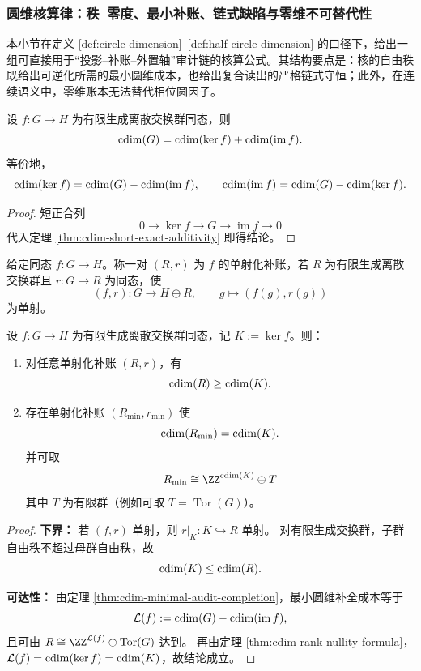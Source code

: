 \subsubsection{圆维核算律：秩--零度、最小补账、链式缺陷与零维不可替代性}\label{subsubsec:cdim-kernel-defect-incompressibility}

本小节在定义 \ref{def:circle-dimension}--\ref{def:half-circle-dimension} 的口径下，给出一组可直接用于“投影--补账--外置轴”审计链的核算公式。其结构要点是：核的自由秩既给出可逆化所需的最小圆维成本，也给出复合读出的严格链式守恒；此外，在连续语义中，零维账本无法替代相位圆因子。

\begin{theorem}\label{thm:cdim-rank-nullity-formula}
设 \(f:G\to H\) 为有限生成离散交换群同态，则
\[
\operatorname{cdim}(G)=\operatorname{cdim}(\ker f)+\operatorname{cdim}(\operatorname{im}f).
\]
等价地，
\[
\operatorname{cdim}(\ker f)=\operatorname{cdim}(G)-\operatorname{cdim}(\operatorname{im}f),\qquad
\operatorname{cdim}(\operatorname{im}f)=\operatorname{cdim}(G)-\operatorname{cdim}(\ker f).
\]
\end{theorem}
\begin{proof}
短正合列
\[
0\longrightarrow \ker f\longrightarrow G\longrightarrow \operatorname{im}f\longrightarrow 0
\]
代入定理 \ref{thm:cdim-short-exact-additivity} 即得结论。
\end{proof}

\begin{definition}[单射化补账]\label{def:cdim-injectivization-ledger}
给定同态 \(f:G\to H\)。称一对 \((R,r)\) 为 \(f\) 的单射化补账，若 \(R\) 为有限生成离散交换群且 \(r:G\to R\) 为同态，使
\[
(f,r):G\longrightarrow H\oplus R,\qquad
g\longmapsto (f(g),r(g))
\]
为单射。
\end{definition}

\begin{theorem}[最小圆维补账成本]\label{thm:cdim-minimal-ledger-cost-kernel}
设 \(f:G\to H\) 为有限生成离散交换群同态，记 \(K:=\ker f\)。则：
\begin{enumerate}
  \item 对任意单射化补账 \((R,r)\)，有
  \[
  \operatorname{cdim}(R)\ge \operatorname{cdim}(K).
  \]
  \item 存在单射化补账 \((R_{\min},r_{\min})\) 使
  \[
  \operatorname{cdim}(R_{\min})=\operatorname{cdim}(K).
  \]
  并可取
  \[
  R_{\min}\cong \ZZ^{\cdim(K)}\oplus T
  \]
  其中 \(T\) 为有限群（例如可取 \(T=\operatorname{Tor}(G)\)）。
\end{enumerate}
\end{theorem}
\begin{proof}
\textbf{下界：}
若 \((f,r)\) 单射，则 \(r|_K:K\hookrightarrow R\) 单射。
对有限生成交换群，子群自由秩不超过母群自由秩，故
\[
\operatorname{cdim}(K)\le \operatorname{cdim}(R).
\]

\textbf{可达性：}
由定理 \ref{thm:cdim-minimal-audit-completion}，最小圆维补全成本等于
\[
\mathcal L(f):=\operatorname{cdim}(G)-\operatorname{cdim}(\operatorname{im}f),
\]
且可由 \(R\cong \ZZ^{\mathcal L(f)}\oplus \operatorname{Tor}(G)\) 达到。
再由定理 \ref{thm:cdim-rank-nullity-formula}，\(\mathcal L(f)=\operatorname{cdim}(\ker f)=\operatorname{cdim}(K)\)，故结论成立。
\end{proof}

